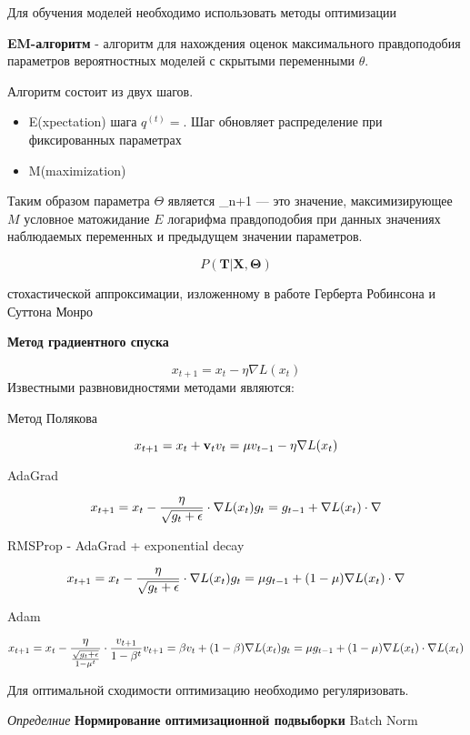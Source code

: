 Для обучения моделей необходимо использовать методы оптимизации



 \textbf{EM-алгоритм} - алгоритм для нахождения оценок
максимального правдоподобия параметров 
 вероятностных моделей с скрытыми переменными $\theta$.

Алгоритм состоит из двух шагов. \begin{itemize}
    \item E(xpectation) шага $q^{(t)} = $. Шаг 
    обновляет распределение при фиксированных параметрах
    \item M(maximization)
\end{itemize}

Таким образом параметра $\Theta$ является
{\displaystyle \Theta _{n+1}} — это значение, максимизирующее $M$ условное матожидание $E$ логарифма правдоподобия при данных значениях наблюдаемых переменных и предыдущем значении параметров. 



$$
    P(\mathbf{T}| \mathbf{X},\mathbf{\Theta})
$$

стохастической аппроксимации,
 изложенному в работе Герберта Робинсона и Суттона Монро \cite{robbins1951stochastic}


 \textbf{Метод градиентного спуска}




$$
x_{t+1} = x_t - \eta \nabla L(x_t)  
$$
Известными развновидностями методами являются:


Метод Полякова

$$
    x_{t+1}= x_t + \mathbf{v}_t \\
    v_t = \mu v_{t-1} - \eta \nabla L(x_t)
$$

AdaGrad 

$$
    x_{t+1} = x_t - \frac{\eta}{\sqrt{g_t+\epsilon}} \cdot \nabla L(x_t) \\
    g_t = g_{t-1} + \nabla L(x_t) \cdot \nabla 
$$

RMSProp - AdaGrad + exponential decay

$$
x_{t+1} = x_t - \frac{\eta}{\sqrt{g_t+\epsilon}} \cdot \nabla L(x_t) \\
    g_t = \mu g_{t-1} + (1-\mu)\nabla L(x_t) \cdot \nabla  
$$

Adam 


$$
x_{t+1} = x_t - \frac{\eta}{\frac{\sqrt{g_t+\epsilon}}{1-\mu^t}} \cdot \frac{v_{t+1}}{1-\beta^t} \\
    v_{t+1} = \beta v_t + (1-\beta) \nabla L(x_t) \\
    g_t = \mu g_{t-1} + (1-\mu)\nabla L(x_t) \cdot \nabla  L(x_t)
$$

Для оптимальной сходимости оптимизацию необходимо регуляризовать.


\cite{ioffe2015batch}
\textit{Определние} \textbf{Нормирование оптимизационной подвыборки}
Batch Norm 







